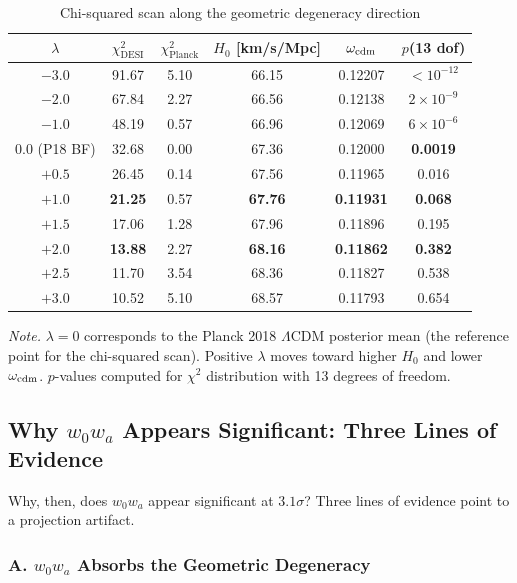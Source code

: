 \documentclass[12pt,preprint]{aastex631}
\begin{document}
\begin{table}[t]
\centering
\caption{Chi-squared scan along the geometric degeneracy direction}
\label{tab:scan}
\begin{tabular}{cccccc}
\toprule
$\lambda$ & $\chi^2_{\mathrm{DESI}}$ & $\chi^2_{\mathrm{Planck}}$ & $H_0$ [km/s/Mpc] & $\omega_{\rm cdm}$ & $p$(13 dof) \\
\midrule
$-3.0$ & 91.67 & 5.10 & 66.15 & 0.12207 & $<10^{-12}$ \\
$-2.0$ & 67.84 & 2.27 & 66.56 & 0.12138 & $2\times10^{-9}$ \\
$-1.0$ & 48.19 & 0.57 & 66.96 & 0.12069 & $6\times10^{-6}$ \\
$0.0$ (P18 BF) & 32.68 & 0.00 & 67.36 & 0.12000 & \textbf{0.0019} \\
$+0.5$ & 26.45 & 0.14 & 67.56 & 0.11965 & 0.016 \\
$+1.0$ & \textbf{21.25} & 0.57 & \textbf{67.76} & \textbf{0.11931} & \textbf{0.068} \\
$+1.5$ & 17.06 & 1.28 & 67.96 & 0.11896 & 0.195 \\
$+2.0$ & \textbf{13.88} & 2.27 & \textbf{68.16} & \textbf{0.11862} & \textbf{0.382} \\
$+2.5$ & 11.70 & 3.54 & 68.36 & 0.11827 & 0.538 \\
$+3.0$ & 10.52 & 5.10 & 68.57 & 0.11793 & 0.654 \\
\bottomrule
\end{tabular}
\vspace{0.3cm}
\par\small\textit{Note.} $\lambda=0$ corresponds to the Planck 2018 $\Lambda$CDM posterior mean (the reference point for the chi-squared scan). Positive $\lambda$ moves toward higher $H_0$ and lower $\omega_{\rm cdm}$. $p$-values computed for $\chi^2$ distribution with 13 degrees of freedom.
\end{table}

\subsection{Why $w_0 w_a$ Appears Significant: Three Lines of Evidence}

Why, then, does $w_0 w_a$ appear significant at $3.1\sigma$? Three lines of evidence point to a projection artifact.

\subsubsection{A. $w_0 w_a$ Absorbs the Geometric Degeneracy}
\end{document}
